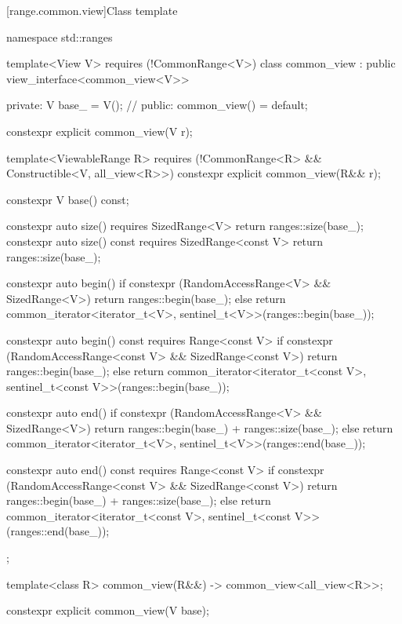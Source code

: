 [range.common.view]{Class template }

\begin{codeblock}
namespace std::ranges {
  template<View V>
    requires (!CommonRange<V>)
  class common_view : public view_interface<common_view<V>> {
  private:
    V base_ = V();  // \expos
  public:
    common_view() = default;

    constexpr explicit common_view(V r);

    template<ViewableRange R>
      requires (!CommonRange<R> && Constructible<V, all_view<R>>)
    constexpr explicit common_view(R&& r);

    constexpr V base() const;

    constexpr auto size() requires SizedRange<V> {
      return ranges::size(base_);
    }
    constexpr auto size() const requires SizedRange<const V> {
      return ranges::size(base_);
    }

    constexpr auto begin() {
      if constexpr (RandomAccessRange<V> && SizedRange<V>)
        return ranges::begin(base_);
      else
        return common_iterator<iterator_t<V>, sentinel_t<V>>(ranges::begin(base_));
    }

    constexpr auto begin() const requires Range<const V> {
      if constexpr (RandomAccessRange<const V> && SizedRange<const V>)
        return ranges::begin(base_);
      else
        return common_iterator<iterator_t<const V>, sentinel_t<const V>>(ranges::begin(base_));
    }

    constexpr auto end() {
      if constexpr (RandomAccessRange<V> && SizedRange<V>)
        return ranges::begin(base_) + ranges::size(base_);
      else
        return common_iterator<iterator_t<V>, sentinel_t<V>>(ranges::end(base_));
    }

    constexpr auto end() const requires Range<const V> {
      if constexpr (RandomAccessRange<const V> && SizedRange<const V>)
        return ranges::begin(base_) + ranges::size(base_);
      else
        return common_iterator<iterator_t<const V>, sentinel_t<const V>>(ranges::end(base_));
    }
  };

  template<class R>
    common_view(R&&) -> common_view<all_view<R>>;
}
\end{codeblock}

%
\begin{itemdecl}
constexpr explicit common_view(V base);
\end{itemdecl}

